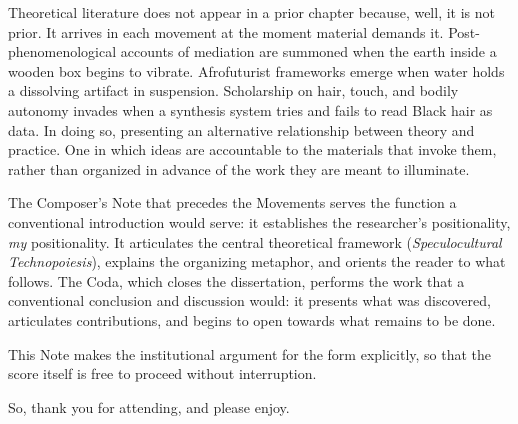 Theoretical literature does not appear in a prior chapter because, well, it is not prior. It arrives in each movement at the moment material demands it. Post-phenomenological accounts of mediation are summoned when the earth inside a wooden box begins to vibrate. Afrofuturist frameworks emerge when water holds a dissolving artifact in suspension. Scholarship on hair, touch, and bodily autonomy invades when a synthesis system tries and fails to read Black hair as data. In doing so, presenting an alternative relationship between theory and practice. One in which ideas are accountable to the materials that invoke them, rather than organized in advance of the work they are meant to illuminate.

The Composer's Note that precedes the Movements serves the function a conventional introduction would serve: it establishes the researcher's positionality, \textit{my} positionality. It articulates the central theoretical framework (\textit{Speculocultural Technopoiesis}), explains the organizing metaphor, and orients the reader to what follows. The Coda, which closes the dissertation, performs the work that a conventional conclusion and discussion would: it presents what was discovered, articulates contributions, and begins to open towards what remains to be done.

This Note makes the institutional argument for the form explicitly, so that the score itself is free to proceed without interruption.

So, thank you for attending, and please enjoy.

